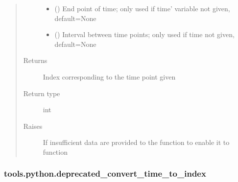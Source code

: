 \documentclass[letterpaper,10pt,english]{sphinxmanual}
\begin{document}
\begin{fulllineitems}
\begin{quote}
\begin{description}
\begin{itemize}
\item {} 
\sphinxAtStartPar
{} (\sphinxstyleliteralemphasis{\sphinxupquote{, }}) \textendash{} End point of time; only used if {\color{red}\bfseries{}\textasciigrave{}}time’ variable not given, default=None

\item {} 
\sphinxAtStartPar
{} (\sphinxstyleliteralemphasis{\sphinxupquote{, }}) \textendash{} Interval between time points; only used if time not given, default=None

\end{itemize}

\item[{Returns}] \leavevmode
\sphinxAtStartPar
{} \textendash{} Index corresponding to the time point given

\item[{Return type}] \leavevmode
\sphinxAtStartPar
int

\item[{Raises}] \leavevmode
\sphinxAtStartPar
{} \textendash{} If insufficient data are provided to the function to enable it to function

\end{description}\end{quote}

\end{fulllineitems}



\subsubsection{tools.python.deprecated\_convert\_time\_to\_index}
\label{\detokenize{_autosummary/tools.python.deprecated_convert_time_to_index:tools-python-deprecated-convert-time-to-index}}\label{\detokenize{_autosummary/tools.python.deprecated_convert_time_to_index::doc}}
\end{document}
